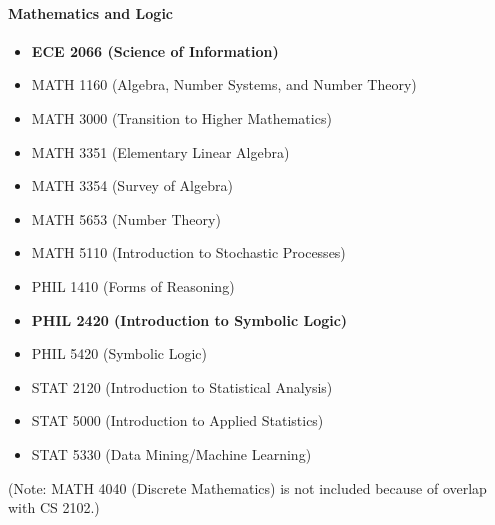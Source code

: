 \documentclass[10pt,letter]{book}
\newenvironment{itemlist}{
\begin{itemize}
\setlength{\itemsep}{0pt}
\setlength{\parskip}{0pt}}
{\end{itemize}}
\begin{document}
\paragraph{Mathematics and Logic}
\begin{itemlist}
\item {\bf ECE 2066 (Science of Information)}
\item MATH 1160 (Algebra, Number Systems, and Number Theory)
\item MATH 3000 (Transition to Higher Mathematics)
\item MATH 3351 (Elementary Linear Algebra)
\item MATH 3354 (Survey of Algebra)
\item MATH 5653 (Number Theory)
\item MATH 5110 (Introduction to Stochastic Processes)
\item PHIL 1410 (Forms of Reasoning)
\item {\bf PHIL 2420 (Introduction to Symbolic Logic)}
\item PHIL 5420 (Symbolic Logic)
\item STAT 2120 (Introduction to Statistical Analysis)
\item STAT 5000 (Introduction to Applied Statistics)
\item STAT 5330 (Data Mining/Machine Learning)
\end{itemlist}

(Note: MATH 4040 (Discrete Mathematics) is not included because of
overlap with CS 2102.)
\end{document}
